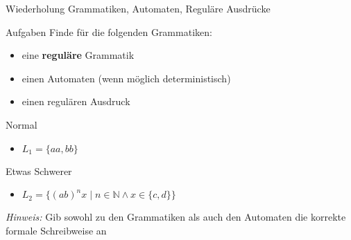 
{
\begin{frame}{Wiederholung Grammatiken, Automaten, Reguläre Ausdrücke}
    \begin{alertblock}{Aufgaben}
        Finde für die folgenden Grammatiken:
        \vspace{-0.3cm}
        \begin{itemize}
            \item eine \textbf{reguläre} Grammatik
            \item einen Automaten (wenn möglich deterministisch)
            \item einen regulären Ausdruck
        \end{itemize}
    \end{alertblock}
    \begin{block}{Normal}
        \begin{itemize}
            \item $L_1 = \{aa, bb\}$
        \end{itemize}
    \end{block}
    \begin{block}{Etwas Schwerer}
        \begin{itemize}
            \item $L_2 = \{(ab)^nx \mid n \in \mathbb{N} \land x \in \{c,d\}\}$
        \end{itemize}
    \end{block}
    \textit{Hinweis:} Gib sowohl zu den Grammatiken als auch den Automaten die korrekte formale Schreibweise an
\end{frame}
}

